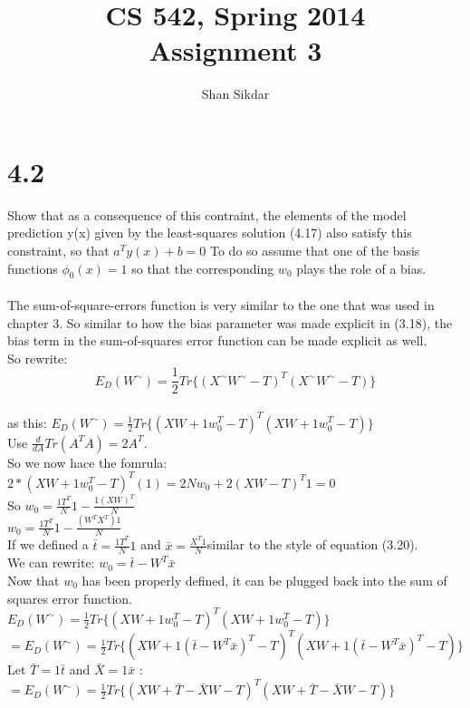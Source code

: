 \documentclass[11pt,leqno,fleqn]{article}
\title{CS 542, Spring 2014
       \\[1ex]
       \textbf{Assignment 3}}
\author{Shan Sikdar}
\date{} %
\begin{document}
\maketitle



\section{ 4.2 }
Show that as a consequence of this contraint, the elements of the model prediction y(x) given by the least-squares solution (4.17) also satisfy this constraint, so that $a^T y(x) + b = 0$ To do so assume that one of the basis functions $\phi_0(x) = 1$ so that the corresponding $w_0$ plays the role of a bias.\\
\\
The sum-of-square-errors function is very similar to the one that was used in chapter 3. So similar to how the bias parameter was made explicit in  (3.18),
the bias term in the sum-of-squares error function can be made explicit as well.\\
So rewrite: $$E_D(W^{\sim})= \frac{1}{2}Tr\{ ( X^{\sim} W^{\sim} - T)^T ( X^{\sim} W^{\sim} - T)  \}$$ \\
as this: $E_D(W^{\sim})= \frac{1}{2}Tr\{ ( X W +1 w_0^T - T)^T ( X W +1 w_0^T - T)  \}$\\ 
 Use $\frac{d}{dA} Tr(A^T A) = 2A^T$.\\
 So we now hace the fomrula:  $2 *  ( X W +1 w_0^T - T)^T (1) = 2Nw_0 + 2(XW-T)^T1 = 0 $\\
So $w_0 = \frac{1 T^T}{N} 1  - \frac{1(XW)^T}{N}$ \\
$w_0 = \frac{1 T^T}{N} 1  - \frac{(W^T X^T)1}{N}$ \\
If we defined a $\bar{t} =  \frac{1 T^T}{N} 1$  and $ \bar{x} = \frac{ X^T 1}{N} $similar to the style of equation (3.20). \\
We can rewrite: $w_0 = \bar{t}  - W^T \bar{x}$ \\
Now that $w_0$ has been properly defined, it can be plugged back into the sum of squares error function.\\
$E_D(W^{\sim})= \frac{1}{2}Tr\{ ( X W +1 w_0^T - T)^T ( X W +1 w_0^T - T)  \}$\\
$ = E_D(W^{\sim})= \frac{1}{2}Tr\{ ( X W +1 (\bar{t}  - W^T \bar{x})^T - T)^T ( X W +1 (\bar{t}  - W^T \bar{x})^T - T)  \}$\\
Let $\bar{T} = 1 \bar{t}$ and $\bar{X}  = 1 \bar{x}$ :\\
$ = E_D(W^{\sim})= \frac{1}{2}Tr\{ ( X W + \bar{T} - \bar{X}W - T)^T ( X W +\bar{T} - \bar{X}W - T)  \}$\\
\end{document}
